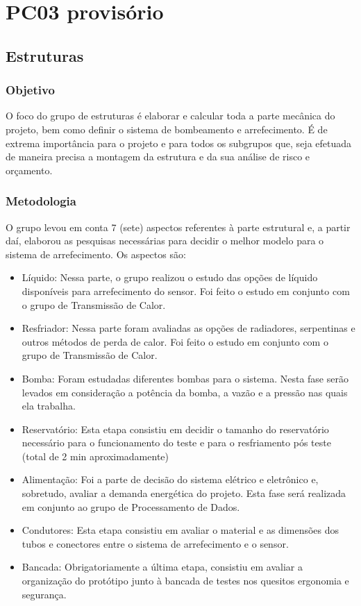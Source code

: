 \chapter{PC03 provisório}


\section{Estruturas}

\subsection{Objetivo}

O foco do grupo de estruturas é elaborar e calcular toda a parte mecânica do projeto, bem como definir o sistema de bombeamento e arrefecimento. É de extrema importância para o projeto e para todos os subgrupos que, seja efetuada de maneira precisa a montagem da estrutura e da sua análise de risco e orçamento.

\subsection{Metodologia}
O grupo levou em conta 7 (sete) aspectos referentes à parte estrutural e, a partir daí, elaborou as pesquisas necessárias para decidir o melhor modelo para o sistema de arrefecimento. Os aspectos são:

\begin{itemize}
\item	Líquido: Nessa parte, o grupo realizou o estudo das opções de líquido disponíveis para arrefecimento do sensor. Foi feito o estudo em conjunto com o grupo de Transmissão de Calor.
\item	Resfriador: Nessa parte foram avaliadas as opções de radiadores, serpentinas e outros métodos de perda de calor. Foi feito o estudo em conjunto com o grupo de Transmissão de Calor.
\item	Bomba: Foram estudadas diferentes bombas para o sistema. Nesta fase serão levados em consideração a potência da bomba, a vazão e a pressão nas quais ela trabalha.
\item Reservatório: Esta etapa consistiu em decidir o tamanho do reservatório necessário para o funcionamento do teste e para o resfriamento pós teste (total de 2 min aproximadamente)
\item	Alimentação: Foi a parte de decisão do sistema elétrico e eletrônico e, sobretudo, avaliar a demanda energética do projeto. Esta fase será realizada em conjunto ao grupo de Processamento de Dados.
\item	Condutores: Esta etapa consistiu em avaliar o material e as dimensões dos tubos e conectores entre o sistema de arrefecimento e o sensor.
\item	Bancada: Obrigatoriamente a última etapa, consistiu em avaliar a organização do protótipo junto à bancada de testes nos quesitos ergonomia e segurança.
\end{itemize}

